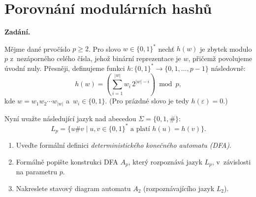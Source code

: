\section{Porovnání modulárních hashů}

\noindent\textbf{Zadání.}\par
Mějme dané prvočíslo $p \geq 2$. Pro slovo $w \in \{0,1\}^*$ nechť $h(w)$ je zbytek
modulo $p$ z~nezáporného celého čísla, jehož binární reprezentace je $w$, přičemž
povolujeme úvodní nuly. Přesněji, definujeme funkci $h\colon \{0,1\}^* \to
\{0, 1, \dots, p-1\}$ následovně:
\[ h(w) = \left( \sum_{i=1}^{|w|} w_i\, 2^{|w|-i} \right) \bmod p, \]
kde $w = w_1 w_2 \cdots w_{|w|}$ a~$w_i \in \{0, 1\}$. (Pro prázdné slovo je tedy
$h(\varepsilon) = 0$.)

Nyní uvažte následující jazyk nad abecedou $\Sigma = \{0, 1, \#\}$:
\[ L_p = \{u \# v \mid u, v \in \{0,1\}^* \text{ a~platí } h(u) = h(v)\}. \]
\begin{enumerate}
\item Uveďte formální definici \textit{deterministického konečného automatu (DFA)}.
\item Formálně popište konstrukci DFA $A_p$, který rozpoznává jazyk $L_p$, v~závislosti
  na parametru $p$.
\item Nakreslete stavový diagram automatu $A_2$ (rozpoznávajícího jazyk $L_2$).
\end{enumerate}

